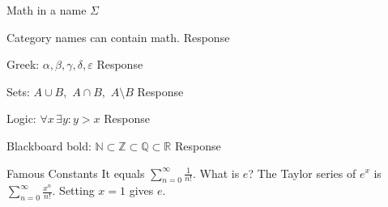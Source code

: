 \documentclass{article}
\newcommand{\R}{\mathbb{R}}
\begin{document}
\begin{category}{Math in a name $\Sigma$}
  \begin{clue}
    Category names can contain math.
  \response
    Response
  \end{clue}
  \begin{clue}
    Greek: $\alpha, \beta, \gamma, \delta, \varepsilon$
  \response
    Response
  \end{clue}
  \begin{clue}
    Sets: $A \cup B,$ $A \cap B,$ $A \setminus B$
  \response
    Response
  \end{clue}
  \begin{clue}
    Logic: $\forall x\, \exists y : y > x$
  \response
    Response
  \end{clue}
  \begin{clue}
    Blackboard bold: $\mathbb{N} \subset \mathbb{Z} \subset \mathbb{Q} \subset \R$
  \response
    Response
  \end{clue}
\end{category}

\begin{final}{Famous Constants}
  It equals $\displaystyle\sum_{n=0}^{\infty} \frac{1}{n!}.$
\response
  What is $e$?
\solution
  The Taylor series of $e^x$ is $\displaystyle\sum_{n=0}^{\infty} \frac{x^n}{n!}.$
  Setting $x = 1$ gives $e.$
\end{final}
\end{document}
